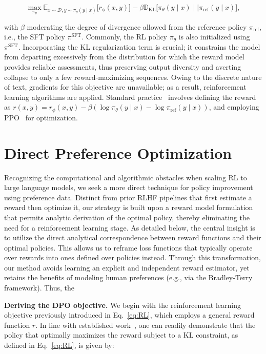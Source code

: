 \begin{equation}\label{eq:RL}
\max_{\pi_{\theta}}  \mathbb{E}_{x\sim \mathcal{D}, y\sim \pi_{\theta}(y \mid x)}\bigl[r_{\phi}(x, y)\bigr] - \beta\mathbb{D}_{\textrm{KL}}\bigl[\pi_{\theta}(y\mid x)\mid \mid \pi_\text{ref}(y\mid x)\bigr],
\end{equation}

with $\beta$ moderating the degree of divergence allowed from the reference policy $\pi_\text{ref}$, i.e., the SFT policy $\pi^\text{SFT}$. Commonly, the RL policy $\pi_\theta$ is also initialized using $\pi^\text{SFT}$. Incorporating the KL regularization term is crucial; it constrains the model from departing excessively from the distribution for which the reward model provides reliable assessments, thus preserving output diversity and averting collapse to only a few reward-maximizing sequences. Owing to the discrete nature of text, gradients for this objective are unavailable; as a result, reinforcement learning algorithms are applied. Standard practice~\citep{ziegler2020finetuning, stiennon2022learning, bai2022training, ouyang2022training} involves defining the reward as ${r(x, y) = r_{\phi}(x, y) -\beta (\log \pi_{\theta}(y\mid x) - \log \pi_\text{ref}(y\mid x))}$, and employing PPO~\cite{schulman2017proximal} for optimization. 

\section{Direct Preference Optimization}\label{sec:DPO}

Recognizing the computational and algorithmic obstacles when scaling RL to large language models, we seek a more direct technique for policy improvement using preference data. Distinct from prior RLHF pipelines that first estimate a reward then optimize it, our strategy is built upon a reward model formulation that permits analytic derivation of the optimal policy, thereby eliminating the need for a reinforcement learning stage. As detailed below, the central insight is to utilize the direct analytical correspondence between reward functions and their optimal policies. This allows us to reframe loss functions that typically operate over rewards into ones defined over policies instead. Through this transformation, our method avoids learning an explicit and independent reward estimator, yet retains the benefits of modeling human preferences (e.g., via the Bradley-Terry framework). Thus, the

\textbf{Deriving the DPO objective.} We begin with the reinforcement learning objective previously introduced in Eq.~\ref{eq:RL}, which employs a general reward function $r$. In line with established work~\citep{peters2007reinforcement, peng2019advantage, korbak2022reinforcement, go2023aligning}, one can readily demonstrate that the policy that optimally maximizes the reward subject to a KL constraint, as defined in Eq.~\ref{eq:RL}, is given by:

